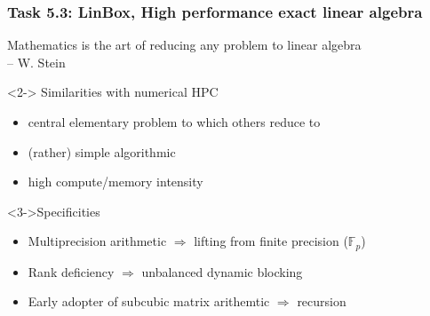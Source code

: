 \documentclass{beamer}
\begin{document}
\begin{frame}
  \frametitle{Task 5.3: LinBox, High performance exact linear algebra}
  \begin{displayquote}
    Mathematics is the art of reducing any problem to linear algebra\\
    \hfill{-- W. Stein}
  \end{displayquote}

  \begin{block}<2-> {Similarities with numerical HPC}
    \begin{itemize}
    \item central elementary problem to which others reduce to
    \item (rather) simple algorithmic
    \item high compute/memory intensity
    \end{itemize}
  \end{block}
    \begin{block}<3->{Specificities}
      \begin{itemize}
      \item Multiprecision arithmetic $\Rightarrow$ lifting from finite  precision ($\mathbb{F}_p$)
      \item Rank deficiency $\Rightarrow$ unbalanced dynamic blocking
      \item Early adopter of subcubic matrix arithemtic $\Rightarrow$ recursion
      \end{itemize}
    \end{block}
      
    \end{frame}
\end{document}
